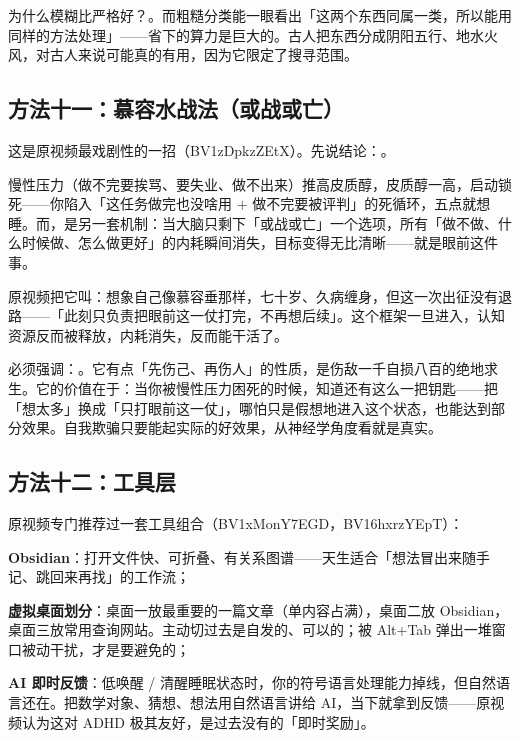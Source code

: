 为什么模糊比严格好？。而粗糙分类能一眼看出「这两个东西同属一类，所以能用同样的方法处理」——省下的算力是巨大的。古人把东西分成阴阳五行、地水火风，对古人来说可能真的有用，因为它限定了搜寻范围。

\subsection{方法十一：慕容水战法（或战或亡）}

这是原视频最戏剧性的一招（BV1zDpkzZEtX）。先说结论：。

慢性压力（做不完要挨骂、要失业、做不出来）推高皮质醇，皮质醇一高，启动锁死——你陷入「这任务做完也没啥用 + 做不完要被评判」的死循环，五点就想睡。而，是另一套机制：当大脑只剩下「或战或亡」一个选项，所有「做不做、什么时候做、怎么做更好」的内耗瞬间消失，目标变得无比清晰——就是眼前这件事。

原视频把它叫：想象自己像慕容垂那样，七十岁、久病缠身，但这一次出征没有退路——「此刻只负责把眼前这一仗打完，不再想后续」。这个框架一旦进入，认知资源反而被释放，内耗消失，反而能干活了。

\begin{notehot}
必须强调：。它有点「先伤己、再伤人」的性质，是伤敌一千自损八百的绝地求生。它的价值在于：当你被慢性压力困死的时候，知道还有这么一把钥匙——把「想太多」换成「只打眼前这一仗」，哪怕只是假想地进入这个状态，也能达到部分效果。自我欺骗只要能起实际的好效果，从神经学角度看就是真实。
\end{notehot}

\subsection{方法十二：工具层}

原视频专门推荐过一套工具组合（BV1xMonY7EGD，BV16hxrzYEpT）：

\begin{checklist}
  \item \textbf{Obsidian}：打开文件快、可折叠、有关系图谱——天生适合「想法冒出来随手记、跳回来再找」的工作流；
  \item \textbf{虚拟桌面划分}：桌面一放最重要的一篇文章（单内容占满），桌面二放 Obsidian，桌面三放常用查询网站。主动切过去是自发的、可以的；被 Alt+Tab 弹出一堆窗口被动干扰，才是要避免的；
  \item \textbf{AI 即时反馈}：低唤醒 / 清醒睡眠状态时，你的符号语言处理能力掉线，但自然语言还在。把数学对象、猜想、想法用自然语言讲给 AI，当下就拿到反馈——原视频认为这对 ADHD 极其友好，是过去没有的「即时奖励」。
\end{checklist}

